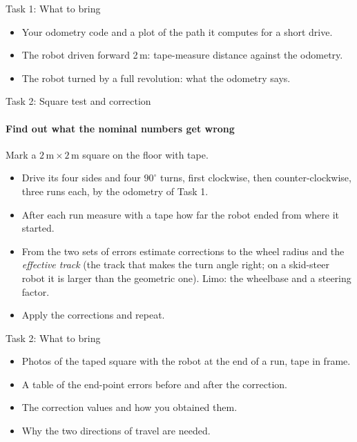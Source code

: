 \documentclass[aspectratio=169]{beamer}
\begin{document}
\begin{frame}[t]{Task 1: What to bring}
    \begin{itemize}
        \item Your odometry code and a plot of the path it computes for a short drive.
        \item The robot driven forward 2\,m: tape-measure distance against the odometry.
        \item The robot turned by a full revolution: what the odometry says.
    \end{itemize}
\end{frame}

\begin{frame}[t]{Task 2: Square test and correction}
\framesubtitle{Find out what the nominal numbers get wrong}
    Mark a $2\,\mathrm{m}\times2\,\mathrm{m}$ square on the floor with tape.
    \begin{itemize}
        \item Drive its four sides and four $90^\circ$ turns, first clockwise, then
              counter-clockwise, three runs each, by the odometry of Task 1.
        \item After each run measure with a tape how far the robot ended from where it
              started.
        \item From the two sets of errors estimate corrections to the wheel radius and the
              \emph{effective track} (the track that makes the turn angle right; on a skid-steer
              robot it is larger than the geometric one). Limo: the wheelbase and a steering factor.
        \item Apply the corrections and repeat.
    \end{itemize}
\end{frame}

\begin{frame}[t]{Task 2: What to bring}
    \begin{itemize}
        \item Photos of the taped square with the robot at the end of a run, tape in frame.
        \item A table of the end-point errors before and after the correction.
        \item The correction values and how you obtained them.
        \item Why the two directions of travel are needed.
    \end{itemize}
\end{frame}
\end{document}
